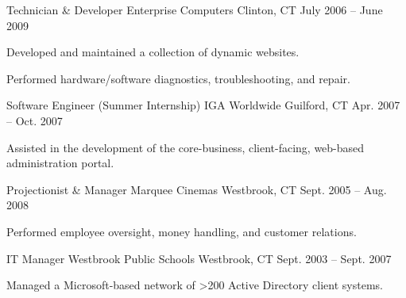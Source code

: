 \begin{cventries}
  \cventry
    {Technician \& Developer} %
    {Enterprise Computers} %
    {Clinton, CT} %
    {July 2006 -- June 2009} %
    {
      \begin{cvitems} %
        \item {Developed and maintained a collection of dynamic websites.}
        \item {Performed hardware/software diagnostics, troubleshooting, and repair.}
      \end{cvitems}
    }

  \cventry
    {Software Engineer (Summer Internship)} %
    {IGA Worldwide} %
    {Guilford, CT} %
    {Apr. 2007 -- Oct. 2007} %
    {
      \begin{cvitems} %
        \item {Assisted in the development of the core-business, client-facing, web-based administration portal.}
      \end{cvitems}
    }

  \cventry
    {Projectionist \& Manager} %
    {Marquee Cinemas} %
    {Westbrook, CT} %
    {Sept. 2005 -- Aug. 2008} %
    {
      \begin{cvitems} %
        \item {Performed employee oversight, money handling, and customer relations.}
      \end{cvitems}
    }

  \cventry
    {IT Manager} %
    {Westbrook Public Schools} %
    {Westbrook, CT} %
    {Sept. 2003 -- Sept. 2007} %
    {
      \begin{cvitems} %
        \item {Managed a Microsoft-based network of >200 Active Directory client systems.}
      \end{cvitems}
    }

\end{cventries}

